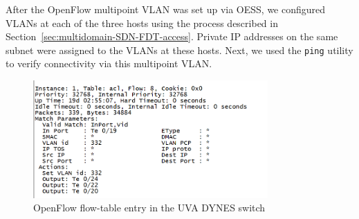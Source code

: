 After the OpenFlow multipoint VLAN was set up via OESS, we configured VLANs at each of the three hosts
 using the process described in Section~\ref{sec:multidomain-SDN-FDT-access}. Private IP addresses on the same subnet were
 assigned to the VLANs at these hosts. Next, we used the \texttt{ping} utility to verify connectivity
 via this multipoint VLAN.

\begin{figure}[htb!]
\centering
\includegraphics[width=0.8\textwidth]{figures/flow-table.png}
\caption{OpenFlow flow-table entry in the UVA DYNES switch}
\label{fig:flowtable}
\end{figure}

